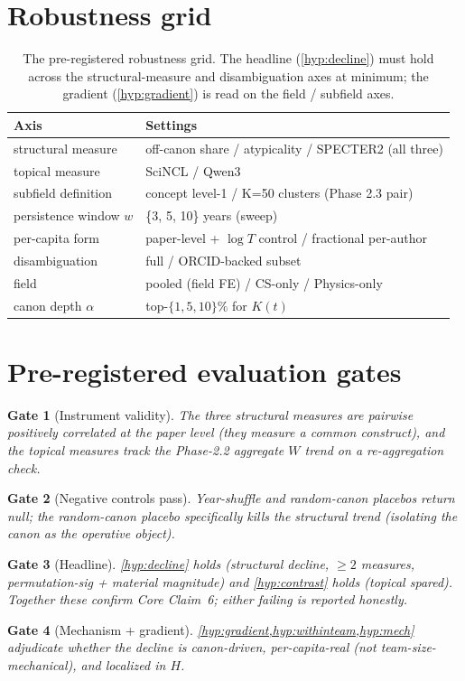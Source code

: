 \documentclass[11pt,letterpaper]{article}
\theoremstyle{definition}
\theoremstyle{plain}
\newtheorem{gate}{Gate}
\begin{document}
\section{Robustness grid}

\begin{table}[h]
\centering
\small
\begin{tabularx}{\textwidth}{@{}lX@{}}
\toprule
Axis & Settings \\
\midrule
structural measure & off-canon share / atypicality / SPECTER2 (all three) \\
topical measure & SciNCL / Qwen3 \\
subfield definition & concept level-1 / K=50 clusters (Phase 2.3 pair) \\
persistence window $w$ & \{3, 5, 10\} years (sweep) \\
per-capita form & paper-level + $\log T$ control / fractional per-author \\
disambiguation & full / ORCID-backed subset \\
field & pooled (field FE) / CS-only / Physics-only \\
canon depth $\alpha$ & top-$\{1,5,10\}\%$ for $K(t)$ \\
\bottomrule
\end{tabularx}
\caption{The pre-registered robustness grid. The headline (\cref{hyp:decline})
must hold across the structural-measure and disambiguation axes at minimum; the
gradient (\cref{hyp:gradient}) is read on the field / subfield axes.}
\label{tab:robust}
\end{table}

\section{Pre-registered evaluation gates}

\begin{gate}[Instrument validity]
The three structural measures are pairwise positively correlated at the paper
level (they measure a common construct), and the topical measures track the
Phase-2.2 aggregate $W$ trend on a re-aggregation check.
\end{gate}
\begin{gate}[Negative controls pass]
Year-shuffle and random-canon placebos return null; the random-canon placebo
specifically kills the structural trend (isolating the canon as the operative
object).
\end{gate}
\begin{gate}[Headline]
\cref{hyp:decline} holds (structural decline, $\ge 2$ measures, permutation-sig +
material magnitude) \emph{and} \cref{hyp:contrast} holds (topical spared).
Together these confirm Core Claim~6; either failing is reported honestly.
\end{gate}
\begin{gate}[Mechanism + gradient]
\cref{hyp:gradient,hyp:withinteam,hyp:mech} adjudicate whether the decline is
canon-driven, per-capita-real (not team-size-mechanical), and localized in $H$.
\end{gate}
\end{document}
